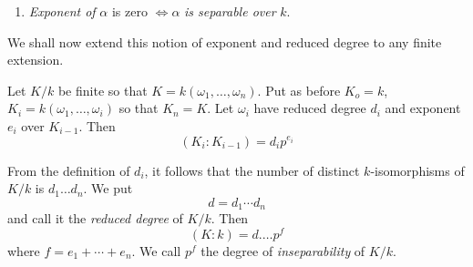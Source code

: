 \begin{enumerate}[1)]
Let $\omega \in \Omega$ and $f(x)$ the minimum polynomial of $\omega$
in $k[x]$. If $t$ = reduced degree of $\omega$, then  
$$
f(x) = \{ (x - \omega_1)\ldots (x - \omega_t) \}^{p^e}
$$
$n = t - p^e$. Let $\omega_1 = \omega$. Consider $\omega_1^{p^e} =
\beta_1$. Then 
$$
f(x) = (x^{p^e} - \beta_1) \cdots (x^{p^e} - \beta_t)
$$
and $\beta_1, \ldots \beta_t$ are separable over $k$. Consider the
field $k (\beta_1)$ which is a subfield of $k(\omega). \beta$ being of
degree $t$ over $k, (k (\beta_1) : k) = t$. This means that  
$$
(k (\omega ) : k (\beta ) ) = p^{e}.
$$

But the interesting fact to note is that $k(\omega)$ has over
$k(\beta)$ only the identity isomorphism or that $k(\omega)$ is fixed
by every $k (\beta)$-automor\-phism\pageoriginale of $\Omega/k (\beta)$.  

Also since every element of $k(\omega)$ is a rational function of
$\omega$ over $k(\beta)$, it follows that  
$$
\lambda^{p^e} \in k(\beta)
$$
for every $\lambda \in k(\omega)$. Thus the integer $e$ has the
property that for every $\lambda \in k(\omega), \lambda^{p^e} \in k
(\beta)$ and there is at least one $\lambda$ (for instance $\omega$)
for which $\lambda^{p^e} \notin k(\beta)$. $\underbar{e}$ is called the
\textit{exponent} of $\omega$, equivalently of $k(\omega)$. We define
the exponent of an algebraic element $\alpha$ over $k$ to be the
integer $e \geq o$ such that $\alpha^{p^e} $ is separable but not
$\alpha^{p^{e-1}}$. Hence

\item \textit{Exponent of} $\alpha$ is zero $\Leftrightarrow \alpha$
  \textit{is separable over} $k$. 
\end{enumerate}

We shall now extend this notion of exponent and reduced degree to any
finite extension. 

Let $K/k$ be finite so that $ K = k (\omega_1 , \ldots ,
\omega_n)$. Put as before $K_o = k$, $K_i = k (\omega_1 ,\ldots
,\omega_i)$ so that $K_n = K$. Let $\omega_i$ have reduced degree $d_i$
and exponent $e_i$ over $K_{i-1}$. Then 
$$
(K_i :  K_{i-1}) = d_i  p^{e_i}
$$

From the definition of $d_i$, it follows that the number of distinct
$k$-isomorphisms of $K/k$ is $d_1 \ldots d_n$. We put  
$$
d = d_1 \cdots d_n
$$
and call it the \textit{reduced degree} of $K/k$. Then  
$$
(K : k) = d. \ldots p^f
$$
where $f = e_1 + \cdots + e_n$. We call $p^f$ the degree of
\textit{inseparability} of $K/k$. 

